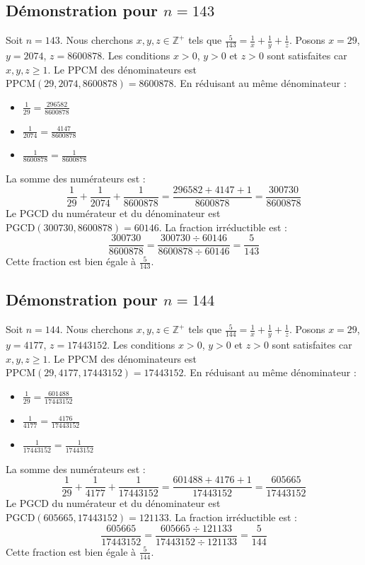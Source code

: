 \documentclass[11pt,a4paper]{article}
\begin{document}
\subsection{Démonstration pour $n = 143$}
Soit $n = 143$. Nous cherchons $x, y, z \in \mathbb{Z}^{+}$ tels que $\frac{5}{143} = \frac{1}{x} + \frac{1}{y} + \frac{1}{z}$.
Posons $x = 29$, $y = 2074$, $z = 8600878$.
Les conditions $x > 0$, $y > 0$ et $z > 0$ sont satisfaites car $x, y, z \geq 1$.
Le PPCM des dénominateurs est $\text{PPCM}(29, 2074, 8600878) = 8600878$.
En réduisant au même dénominateur :
\begin{itemize}
    \item $\frac{1}{29} = \frac{296582}{8600878}$
    \item $\frac{1}{2074} = \frac{4147}{8600878}$
    \item $\frac{1}{8600878} = \frac{1}{8600878}$
\end{itemize}
La somme des numérateurs est :
$$ \frac{1}{29} + \frac{1}{2074} + \frac{1}{8600878} = \frac{296582 + 4147 + 1}{8600878} = \frac{300730}{8600878} $$
Le PGCD du numérateur et du dénominateur est $\text{PGCD}(300730, 8600878) = 60146$.
La fraction irréductible est :
$$ \frac{300730}{8600878} = \frac{300730 \div 60146}{8600878 \div 60146} = \frac{5}{143} $$
Cette fraction est bien égale à $\frac{5}{143}$.

\subsection{Démonstration pour $n = 144$}
Soit $n = 144$. Nous cherchons $x, y, z \in \mathbb{Z}^{+}$ tels que $\frac{5}{144} = \frac{1}{x} + \frac{1}{y} + \frac{1}{z}$.
Posons $x = 29$, $y = 4177$, $z = 17443152$.
Les conditions $x > 0$, $y > 0$ et $z > 0$ sont satisfaites car $x, y, z \geq 1$.
Le PPCM des dénominateurs est $\text{PPCM}(29, 4177, 17443152) = 17443152$.
En réduisant au même dénominateur :
\begin{itemize}
    \item $\frac{1}{29} = \frac{601488}{17443152}$
    \item $\frac{1}{4177} = \frac{4176}{17443152}$
    \item $\frac{1}{17443152} = \frac{1}{17443152}$
\end{itemize}
La somme des numérateurs est :
$$ \frac{1}{29} + \frac{1}{4177} + \frac{1}{17443152} = \frac{601488 + 4176 + 1}{17443152} = \frac{605665}{17443152} $$
Le PGCD du numérateur et du dénominateur est $\text{PGCD}(605665, 17443152) = 121133$.
La fraction irréductible est :
$$ \frac{605665}{17443152} = \frac{605665 \div 121133}{17443152 \div 121133} = \frac{5}{144} $$
Cette fraction est bien égale à $\frac{5}{144}$.
\end{document}
